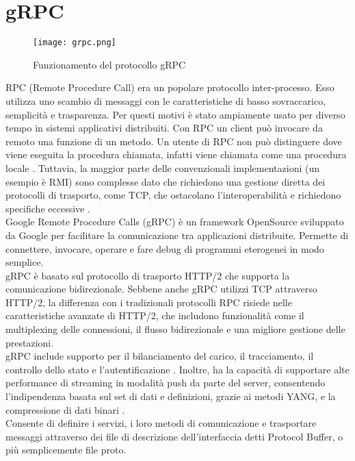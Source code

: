 \section{gRPC} \label{grpc}
\begin{figure}[h]
    \centering
   \texttt{[image: grpc.png]}
    \caption{Funzionamento del protocollo gRPC \cite{librogrpc}}
    \label{fig:grpc}
\end{figure}
RPC (Remote Procedure Call) era un popolare protocollo inter-processo\cite{librogrpc}.
Esso utilizza uno scambio di messaggi con le caratteristiche di basso sovraccarico, semplicità e trasparenza.
Per questi motivi è stato ampiamente usato per diverso tempo in sistemi applicativi distribuiti.
Con RPC un client può invocare da remoto una funzione di un metodo.
Un utente di RPC non può distinguere dove viene eseguita la procedura chiamata, infatti viene chiamata come una procedura locale \cite{grpcArt2}.
Tuttavia, la maggior parte delle convenzionali implementazioni (un esempio è RMI) sono complesse dato che richiedono una gestione diretta dei protocolli di trasporto, come TCP, che ostacolano l'interoperabilità e richiedono specifiche eccessive \cite{librogrpc}.
\\Google Remote Procedure Calls (gRPC\cite{grpc}) è un framework OpenSource sviluppato da Google per facilitare la comunicazione tra applicazioni distribuite. Permette di
connettere, invocare, operare e fare debug di programmi eterogenei in modo semplice.
\\gRPC è basato sul protocollo di trasporto HTTP/2 che supporta la comunicazione bidirezionale. 
Sebbene anche gRPC utilizzi TCP attraverso HTTP/2, la differenza con i tradizionali protocolli RPC risiede nelle caratteristiche avanzate di HTTP/2, che includono funzionalità come il multiplexing delle connessioni, il flusso bidirezionale 
e una migliore gestione delle prestazioni. 
\\gRPC include supporto per il bilanciamento del carico, il tracciamento, il controllo dello stato e l'autentificazione\cite{grpcArt3} \cite{grpcArt1}.
Inoltre, ha la capacità di supportare alte performance di streaming in modalità push da parte del server, consentendo l'indipendenza basata sul set di dati e definizioni, grazie ai metodi YANG,
e la compressione di dati binari \cite{grpcArt3}.
\\Consente di definire i servizi, i loro metodi di comunicazione e trasportare messaggi attraverso dei file di descrizione dell'interfaccia detti Protocol Buffer, o più semplicemente file proto.
